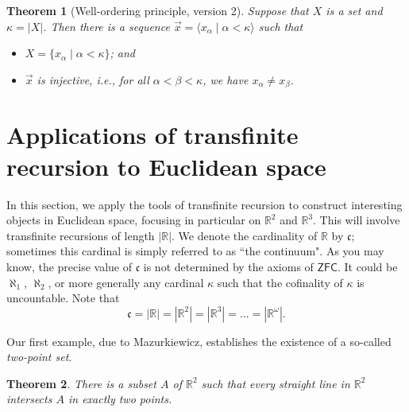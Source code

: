\documentclass[a4paper]{memoir}
\newtheorem{theorem}{Theorem}[section]
\theoremstyle{definition}
\newcommand{\bb}{\mathbb}
\begin{document}
\begin{theorem}[Well-ordering principle, version 2]
  Suppose that $X$ is a set and $\kappa = |X|$. Then there is a sequence $\vec{x} = \langle x_\alpha 
  \mid \alpha < \kappa \rangle$ such that
  \begin{itemize}
    \item $X = \{x_\alpha \mid \alpha < \kappa\}$; and
    \item $\vec{x}$ is injective, i.e., for all $\alpha < \beta < \kappa$, we have $x_\alpha 
    \neq x_\beta$.
  \end{itemize}
\end{theorem}

\section{Applications of transfinite recursion to Euclidean space}

In this section, we apply the tools of transfinite recursion to construct interesting objects in 
Euclidean space, focusing in particular on $\bb{R}^2$ and $\bb{R}^3$. This will involve transfinite 
recursions of length $|\bb{R}|$. We denote the cardinality of $\bb{R}$ by $\mathfrak{c}$; sometimes 
this cardinal is simply referred to as ``the continuum". As you may know, the precise value of 
$\mathfrak{c}$ is not determined by the axioms of $\mathsf{ZFC}$. It could be $\aleph_1$, $\aleph_2$, or 
more generally any cardinal $\kappa$ such that the cofinality of $\kappa$ is uncountable. 
Note that 
\[
  \mathfrak{c} = |\mathbb{R}| = |\mathbb{R}^2| = |\mathbb{R}^3| = \ldots = |\mathbb{R}^\omega|.
\]

Our first example, due to Mazurkiewicz, establishes the existence of a so-called \emph{two-point set}.

\begin{theorem} \label{thm: two_point_set}
  There is a subset $A$ of $\bb{R}^2$ such that every straight line in $\bb{R}^2$ intersects 
  $A$ in exactly two points.
\end{theorem}
\end{document}

